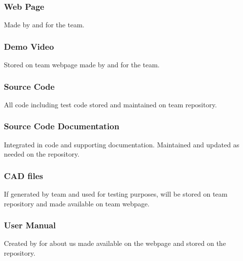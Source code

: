 \subsubsection{Web Page}
Made by and for the team.

\subsubsection{Demo Video}
Stored on team webpage made by and for the team.

\subsubsection{Source Code}
All code including test code stored and maintained on team repository.

\subsubsection{Source Code Documentation}
Integrated in code and supporting documentation. Maintained and updated as needed on the repository.

\subsubsection{CAD files}
If generated by team and used for testing purposes, will be stored on team repository and made available on team webpage.

\subsubsection{User Manual}
Created by for about us made available on the webpage and stored on the repository.